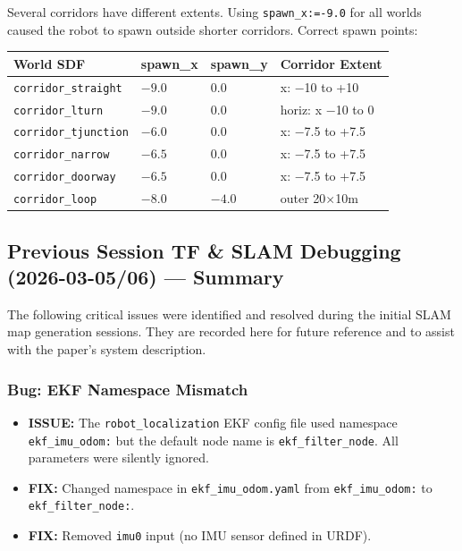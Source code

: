 \documentclass[11pt]{article}
\newcommand{\issue}[1]{\textcolor{issuered}{\textbf{ISSUE:} #1}}
\newcommand{\fix}[1]{\textcolor{fixgreen}{\textbf{FIX:} #1}}
\begin{document}
Several corridors have different extents. Using \texttt{spawn\_x:=-9.0} for all
worlds caused the robot to spawn outside shorter corridors. Correct spawn points:

\begin{center}
\begin{tabular}{llll}
\textbf{World SDF} & \textbf{spawn\_x} & \textbf{spawn\_y} & \textbf{Corridor Extent} \\
\hline
\texttt{corridor\_straight} & $-9.0$ & $0.0$ & x: $-$10 to +10 \\
\texttt{corridor\_lturn} & $-9.0$ & $0.0$ & horiz: x $-$10 to 0 \\
\texttt{corridor\_tjunction} & $-6.0$ & $0.0$ & x: $-$7.5 to +7.5 \\
\texttt{corridor\_narrow} & $-6.5$ & $0.0$ & x: $-$7.5 to +7.5 \\
\texttt{corridor\_doorway} & $-6.5$ & $0.0$ & x: $-$7.5 to +7.5 \\
\texttt{corridor\_loop} & $-8.0$ & $-4.0$ & outer 20$\times$10m \\
\end{tabular}
\end{center}

\subsection*{Previous Session TF \& SLAM Debugging (2026-03-05/06) --- Summary}

The following critical issues were identified and resolved during the initial
SLAM map generation sessions. They are recorded here for future reference and
to assist with the paper's system description.

\subsubsection*{Bug: EKF Namespace Mismatch}
\begin{itemize}
  \item \issue{The \texttt{robot\_localization} EKF config file used namespace
    \texttt{ekf\_imu\_odom:} but the default node name is \texttt{ekf\_filter\_node}.
    All parameters were silently ignored.}
  \item \fix{Changed namespace in \texttt{ekf\_imu\_odom.yaml} from
    \texttt{ekf\_imu\_odom:} to \texttt{ekf\_filter\_node:}.}
  \item \fix{Removed \texttt{imu0} input (no IMU sensor defined in URDF).}
\end{itemize}
\end{document}

